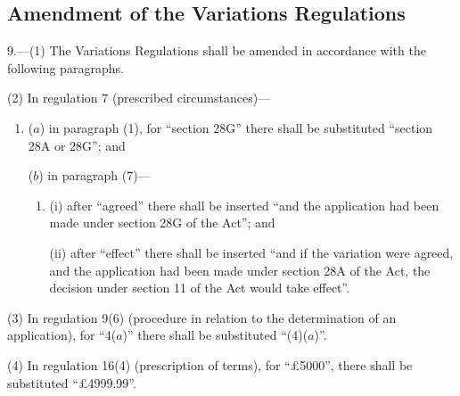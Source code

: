 \documentclass[12pt,a4paper]{article}
\begin{document}
\subsection[9. Amendment of the Variations Regulations]{Amendment of the Variations Regulations}

9.---(1)  The Variations Regulations shall be amended in accordance with the following paragraphs.

(2) In regulation 7 (prescribed circumstances)—
\begin{enumerate}\item[]
($a$) in paragraph (1), for “section 28G” there shall be substituted “section 28A or 28G”; and

($b$) in paragraph (7)—
\begin{enumerate}\item[]
(i) after “agreed” there shall be inserted “and the application had been made under section 28G of the Act”; and

(ii) after “effect” there shall be inserted “and if the variation were agreed, and the application had been made under section 28A of the Act, the decision under section 11 of the Act would take effect”.
\end{enumerate}
\end{enumerate}

(3) In regulation 9(6) (procedure in relation to the determination of an application), for “4($a$)” there shall be substituted “(4)($a$)”.

(4) In regulation 16(4) (prescription of terms), for “£5000”, there shall be substituted “£4999$.$99”.
\end{document}
